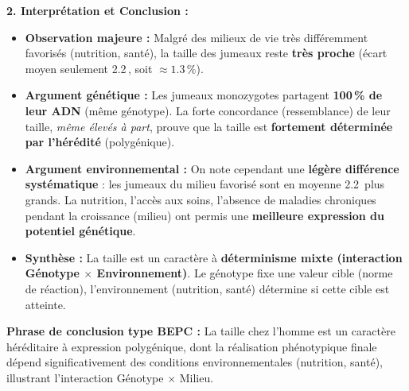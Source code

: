 \documentclass[11pt]{article}
\newcommand{\cle}[1]{{\popxbold\color{popdark}#1}}
\begin{document}
\begin{exoresolu}
\textbf{2. Interprétation et Conclusion :}
\begin{itemize}
    \item \textbf{Observation majeure :} Malgré des milieux de vie très différemment favorisés (nutrition, santé), la taille des jumeaux reste \textbf{très proche} (écart moyen seulement \num{2,2}\,, soit $\approx \num{1,3}\,\%$).
    \item \textbf{Argument génétique :} Les jumeaux monozygotes partagent \textbf{100\,\% de leur ADN} (même génotype). La forte concordance (ressemblance) de leur taille, \emph{même élevés à part}, prouve que la taille est \textbf{fortement déterminée par l'hérédité} (polygénique).
    \item \textbf{Argument environnemental :} On note cependant une \textbf{légère différence systématique} : les jumeaux du milieu favorisé sont en moyenne \num{2,2}\, plus grands. La nutrition, l'accès aux soins, l'absence de maladies chroniques pendant la croissance (milieu) ont permis une \textbf{meilleure expression du potentiel génétique}.
    \item \textbf{Synthèse :} La taille est un caractère à \textbf{déterminisme mixte (interaction Génotype $\times$ Environnement)}. Le génotype fixe une \cle{valeur cible} (norme de réaction), l'environnement (nutrition, santé) détermine si cette cible est atteinte.
\end{itemize}
\textbf{Phrase de conclusion type BEPC :} \og La taille chez l'homme est un caractère héréditaire à expression polygénique, dont la réalisation phénotypique finale dépend significativement des conditions environnementales (nutrition, santé), illustrant l'interaction Génotype $\times$ Milieu. \fg
\end{exoresolu}
\end{document}
